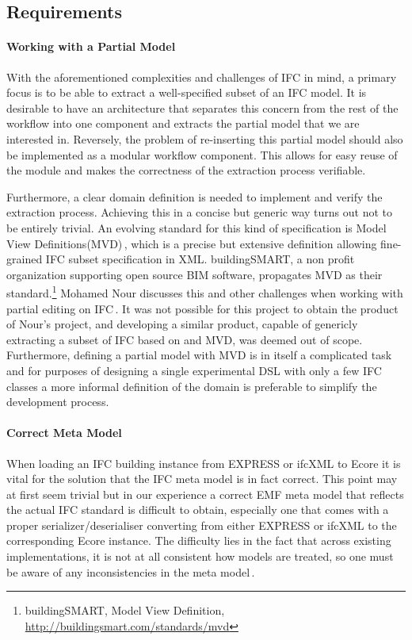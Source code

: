 \subsection{Requirements}
\label{subsec:requirements}
\paragraph{Working with a Partial Model}
With the aforementioned complexities and challenges of IFC in mind, a primary focus is to be able to extract a well-specified subset of an IFC model. It is desirable to have an architecture that separates this concern from the rest of the workflow into one component and extracts the partial model that we are interested in. Reversely, the problem of re-inserting this partial model should also be implemented as a modular workflow component. This allows for easy reuse of the module and makes the correctness of the extraction process verifiable.

Furthermore, a clear domain definition is needed to implement and verify the extraction process. Achieving this in a concise but generic way turns out not to be entirely trivial. An evolving standard for this kind of specification is Model View Definitions(MVD)\,\cite{nour08}, which is a precise but extensive definition allowing fine-grained IFC subset specification in XML. buildingSMART, a non profit organization supporting open source BIM software, propagates MVD as their standard.\footnote{buildingSMART, Model View Definition, \url{http://buildingsmart.com/standards/mvd}} Mohamed Nour discusses this and other challenges when working with partial editing on IFC\,\cite{nour08}. It was not possible for this project to obtain the product of Nour's project, and developing a similar product, capable of genericly extracting a subset of IFC based on and MVD, was deemed out of scope. Furthermore, defining a partial model with MVD is in itself a complicated task and for purposes of designing a single experimental DSL with only a few IFC classes a more informal definition of the domain is preferable to simplify the development process.

\paragraph{Correct Meta Model}
When loading an IFC building instance from EXPRESS or ifcXML to Ecore it is vital for the solution that the IFC meta model is in fact correct. This point may at first seem trivial but in our experience a correct EMF meta model that reflects the actual IFC standard is difficult to obtain, especially one that comes with a proper serializer/deserialiser converting from either EXPRESS or ifcXML to the corresponding Ecore instance. The difficulty lies in the fact that across existing implementations, it is not at all consistent how models are treated, so one must be aware of any inconsistencies in the meta model\,\cite[pp. 4]{quteprints37725}. %

